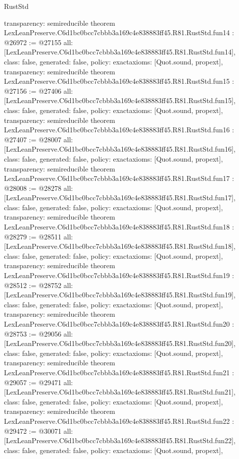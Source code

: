 \begin{lexlean}{RustStd}
\begin{coremodule}
{  transparency: semireducible
}
theorem LexLeanPreserve.C6d1bc0bcc7cbbb3a169c4e838883ff45.R81.RustStd.fun14 : @26972 := @27155 {
  all: [LexLeanPreserve.C6d1bc0bcc7cbbb3a169c4e838883ff45.R81.RustStd.fun14],
  class: false,
  generated: false,
  policy: exact{axioms: [Quot.sound, propext]},
  transparency: semireducible
}
theorem LexLeanPreserve.C6d1bc0bcc7cbbb3a169c4e838883ff45.R81.RustStd.fun15 : @27156 := @27406 {
  all: [LexLeanPreserve.C6d1bc0bcc7cbbb3a169c4e838883ff45.R81.RustStd.fun15],
  class: false,
  generated: false,
  policy: exact{axioms: [Quot.sound, propext]},
  transparency: semireducible
}
theorem LexLeanPreserve.C6d1bc0bcc7cbbb3a169c4e838883ff45.R81.RustStd.fun16 : @27407 := @28007 {
  all: [LexLeanPreserve.C6d1bc0bcc7cbbb3a169c4e838883ff45.R81.RustStd.fun16],
  class: false,
  generated: false,
  policy: exact{axioms: [Quot.sound, propext]},
  transparency: semireducible
}
theorem LexLeanPreserve.C6d1bc0bcc7cbbb3a169c4e838883ff45.R81.RustStd.fun17 : @28008 := @28278 {
  all: [LexLeanPreserve.C6d1bc0bcc7cbbb3a169c4e838883ff45.R81.RustStd.fun17],
  class: false,
  generated: false,
  policy: exact{axioms: [Quot.sound, propext]},
  transparency: semireducible
}
theorem LexLeanPreserve.C6d1bc0bcc7cbbb3a169c4e838883ff45.R81.RustStd.fun18 : @28279 := @28511 {
  all: [LexLeanPreserve.C6d1bc0bcc7cbbb3a169c4e838883ff45.R81.RustStd.fun18],
  class: false,
  generated: false,
  policy: exact{axioms: [Quot.sound, propext]},
  transparency: semireducible
}
theorem LexLeanPreserve.C6d1bc0bcc7cbbb3a169c4e838883ff45.R81.RustStd.fun19 : @28512 := @28752 {
  all: [LexLeanPreserve.C6d1bc0bcc7cbbb3a169c4e838883ff45.R81.RustStd.fun19],
  class: false,
  generated: false,
  policy: exact{axioms: [Quot.sound, propext]},
  transparency: semireducible
}
theorem LexLeanPreserve.C6d1bc0bcc7cbbb3a169c4e838883ff45.R81.RustStd.fun20 : @28753 := @29056 {
  all: [LexLeanPreserve.C6d1bc0bcc7cbbb3a169c4e838883ff45.R81.RustStd.fun20],
  class: false,
  generated: false,
  policy: exact{axioms: [Quot.sound, propext]},
  transparency: semireducible
}
theorem LexLeanPreserve.C6d1bc0bcc7cbbb3a169c4e838883ff45.R81.RustStd.fun21 : @29057 := @29471 {
  all: [LexLeanPreserve.C6d1bc0bcc7cbbb3a169c4e838883ff45.R81.RustStd.fun21],
  class: false,
  generated: false,
  policy: exact{axioms: [Quot.sound, propext]},
  transparency: semireducible
}
theorem LexLeanPreserve.C6d1bc0bcc7cbbb3a169c4e838883ff45.R81.RustStd.fun22 : @29472 := @30071 {
  all: [LexLeanPreserve.C6d1bc0bcc7cbbb3a169c4e838883ff45.R81.RustStd.fun22],
  class: false,
  generated: false,
  policy: exact{axioms: [Quot.sound, propext]},
}
\end{coremodule}
\end{lexlean}
